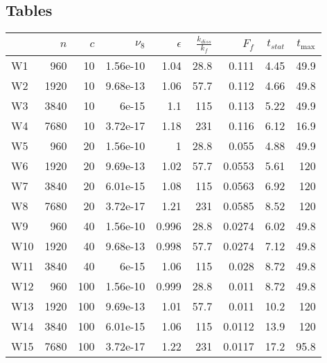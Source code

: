 \documentclass[a4paper]{article}
\begin{document}
\subsection{Tables}
\begin{tabular}{lrrrrrrrr}
\toprule
{} &   $n$ &  $c$ &  $\nu_8$ &  $\epsilon$ &  $\frac{k_{diss}}{k_f}$ &   $F_f$ &  $t_{stat}$ &  $t_{\max}$ \\
\midrule
W1  &   960 &   10 & 1.56e-10 &        1.04 &                    28.8 &   0.111 &        4.45 &        49.9 \\
W2  &  1920 &   10 & 9.68e-13 &        1.06 &                    57.7 &   0.112 &        4.66 &        49.8 \\
W3  &  3840 &   10 &    6e-15 &         1.1 &                     115 &   0.113 &        5.22 &        49.9 \\
W4  &  7680 &   10 & 3.72e-17 &        1.18 &                     231 &   0.116 &        6.12 &        16.9 \\
W5  &   960 &   20 & 1.56e-10 &           1 &                    28.8 &   0.055 &        4.88 &        49.9 \\
W6  &  1920 &   20 & 9.69e-13 &        1.02 &                    57.7 &  0.0553 &        5.61 &         120 \\
W7  &  3840 &   20 & 6.01e-15 &        1.08 &                     115 &  0.0563 &        6.92 &         120 \\
W8  &  7680 &   20 & 3.72e-17 &        1.21 &                     231 &  0.0585 &        8.52 &         120 \\
W9  &   960 &   40 & 1.56e-10 &       0.996 &                    28.8 &  0.0274 &        6.02 &        49.8 \\
W10 &  1920 &   40 & 9.68e-13 &       0.998 &                    57.7 &  0.0274 &        7.12 &        49.8 \\
W11 &  3840 &   40 &    6e-15 &        1.06 &                     115 &   0.028 &        8.72 &        49.8 \\
W12 &   960 &  100 & 1.56e-10 &       0.999 &                    28.8 &   0.011 &        8.72 &        49.8 \\
W13 &  1920 &  100 & 9.69e-13 &        1.01 &                    57.7 &   0.011 &        10.2 &         120 \\
W14 &  3840 &  100 & 6.01e-15 &        1.06 &                     115 &  0.0112 &        13.9 &         120 \\
W15 &  7680 &  100 & 3.72e-17 &        1.22 &                     231 &  0.0117 &        17.2 &        95.8 \\

\end{tabular}
\end{document}
